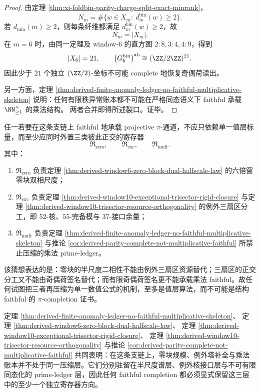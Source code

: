 \begin{proof}
由定理 \ref{thm:xi-foldbin-parity-charge-split-exact-minrank}，
\[
N_m=\#\{w\in X_m:\ d_m^{\mathrm{bin}}(w)\ge 2\}.
\]
若 \(d_{\min}(m)\ge 2\)，则每条纤维都满足 \(d_m^{\mathrm{bin}}(w)\ge 2\)，故
\[
N_m=|X_m|.
\]
在 \(m=6\) 时，由同一定理及 window-\(6\) 的直方图 \(2:8,3:4,4:9\)，得到
\[
|X_6|=21,
\qquad
\bigl(G_6^{\mathrm{bin}}\bigr)^{\mathrm{ab}}\cong (\ZZ/2\ZZ)^{21}.
\]
因此少于 \(21\) 个独立 \((\ZZ/2)\)-坐标不可能 complete 地恢复奇偶荷读出。

另一方面，定理
\ref{thm:derived-finite-anomaly-ledger-no-faithful-multiplicative-skeleton}
说明：任何有限秩异常账本都不可能在严格同态语义下 faithful 承载 \(\NN_{\ge1}^{\times}\) 的乘法结构。
两者合并即得所述裂口。证毕。
\end{proof}

\begin{conjecture}\label{conj:derived-pi-faithful-zero-exc-mult-three-register}
任一若要在这条支链上 faithful 地承载 projective \(\pi\)-通道，不应只依赖单一值层标量，而至少应同时外置三类彼此正交的寄存器
\[
\mathfrak R_{\mathrm{zero}},
\qquad
\mathfrak R_{\mathrm{exc}},
\qquad
\mathfrak R_{\mathrm{mult}}.
\]
其中：
\begin{enumerate}
\normalfont
  \item \(\mathfrak R_{\mathrm{zero}}\) 负责定理 \ref{thm:derived-window6-zero-block-dual-halfscale-law} 的六倍窗零块双相尺度；
  \item \(\mathfrak R_{\mathrm{exc}}\) 负责定理 \ref{thm:derived-window10-exceptional-trisector-rigid-closure} 与定理 \ref{thm:derived-window10-trisector-resource-orthogonality} 的例外三扇区分工，即 \(52\)-核、\(55\)-完备模与 \(37\)-接口余量；
  \item \(\mathfrak R_{\mathrm{mult}}\) 负责定理 \ref{thm:derived-finite-anomaly-ledger-no-faithful-multiplicative-skeleton} 与推论 \ref{cor:derived-parity-complete-not-multiplicative-faithful} 所禁止压缩的乘法 prime-ledger。
\end{enumerate}
该猜想表达的是：零块的半尺度二相性不能由例外三扇区资源替代；三扇区的正交分工又不能由奇偶荷签名替代；而有限奇偶荷签名更不能承载乘法 faithful。故任何试图把三者再压缩为单一数值公式的机制，至多是值层算法，而不可能是结构 faithful 的 \(\pi\)-completion 证书。
\end{conjecture}

\begin{remark}[统一链]\label{rem:derived-zero-exceptional-primeledger-unified-chain}
定理 \ref{thm:derived-finite-anomaly-ledger-no-faithful-multiplicative-skeleton}、
定理 \ref{thm:derived-window6-zero-block-dual-halfscale-law}、
定理 \ref{thm:derived-window10-exceptional-trisector-rigid-closure}、
定理 \ref{thm:derived-window10-trisector-resource-orthogonality}
与推论 \ref{cor:derived-parity-complete-not-multiplicative-faithful}
共同表明：在这条支链上，零块规模、例外塔补全与乘法账本并不处于同一压缩层。它们分别驻留在半尺度谱层、例外核接口层与不可有限同态化的 prime-ledger 层，因此任何 faithful completion 都必须显式保留这三层中的至少一个独立寄存器方向。
\end{remark}

\endinput
